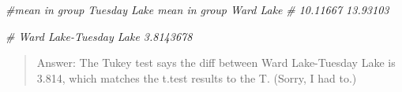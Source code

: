 \documentclass[
]{article}
\newenvironment{Shaded}{\begin{snugshade}}{\end{snugshade}}
\newcommand{\CommentTok}[1]{\textcolor[rgb]{0.56,0.35,0.01}{\textit{#1}}}
\begin{document}
\begin{Shaded}
\begin{Highlighting}[]
\CommentTok{\#mean in group Tuesday Lake    mean in group Ward Lake }
\CommentTok{\#                 10.11667                   13.93103 }


\CommentTok{\# Ward Lake{-}Tuesday Lake       3.8143678 }
\end{Highlighting}
\end{Shaded}

\begin{quote}
Answer: The Tukey test says the diff between Ward Lake-Tuesday Lake is
3.814, which matches the t.test results to the T. (Sorry, I had to.)
\end{quote}
\end{document}
